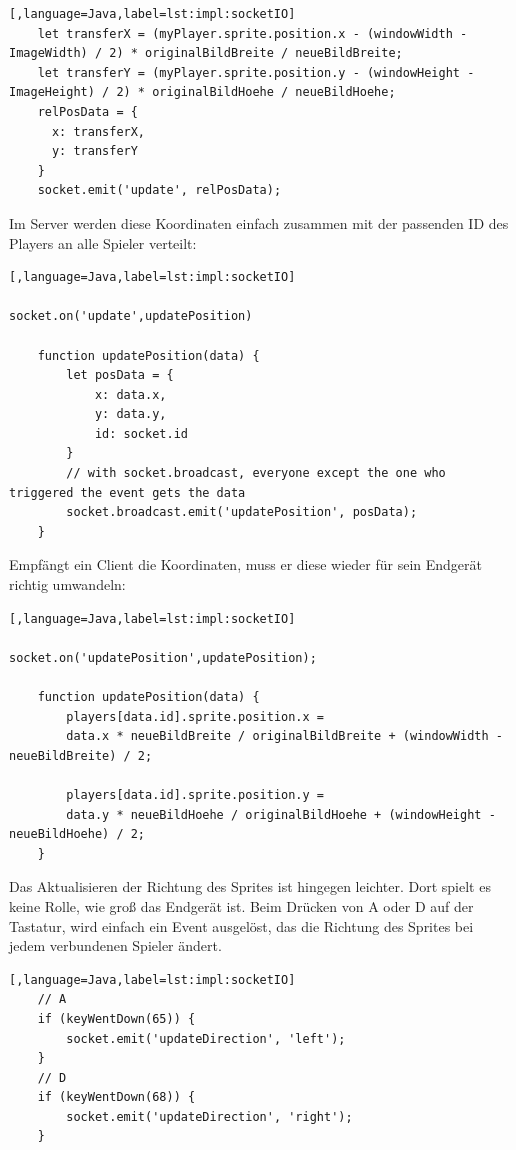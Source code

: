 \begin{lstlisting}[,language=Java,label=lst:impl:socketIO]
    let transferX = (myPlayer.sprite.position.x - (windowWidth - ImageWidth) / 2) * originalBildBreite / neueBildBreite;
    let transferY = (myPlayer.sprite.position.y - (windowHeight - ImageHeight) / 2) * originalBildHoehe / neueBildHoehe;
    relPosData = {
      x: transferX,
      y: transferY
    }
    socket.emit('update', relPosData);
\end{lstlisting}

Im Server werden diese Koordinaten einfach zusammen mit der passenden ID des Players an alle Spieler verteilt:

\begin{lstlisting}[,language=Java,label=lst:impl:socketIO]

socket.on('update',updatePosition)

    function updatePosition(data) {
        let posData = {
            x: data.x,
            y: data.y,
            id: socket.id
        }
        // with socket.broadcast, everyone except the one who triggered the event gets the data
        socket.broadcast.emit('updatePosition', posData);
    }
\end{lstlisting}

Empfängt ein Client die Koordinaten, muss er diese wieder für sein Endgerät richtig umwandeln:


\begin{lstlisting}[,language=Java,label=lst:impl:socketIO]

socket.on('updatePosition',updatePosition);

    function updatePosition(data) {
        players[data.id].sprite.position.x = 
        data.x * neueBildBreite / originalBildBreite + (windowWidth - neueBildBreite) / 2;

        players[data.id].sprite.position.y = 
        data.y * neueBildHoehe / originalBildHoehe + (windowHeight - neueBildHoehe) / 2;
    }
\end{lstlisting}

Das Aktualisieren der Richtung des Sprites ist hingegen leichter. Dort spielt es keine Rolle, wie groß das Endgerät ist.
Beim Drücken von A oder D auf der Tastatur, wird einfach ein Event ausgelöst, das die Richtung des Sprites bei jedem verbundenen Spieler ändert.


\begin{lstlisting}[,language=Java,label=lst:impl:socketIO]
    // A
    if (keyWentDown(65)) {
        socket.emit('updateDirection', 'left');
    }
    // D
    if (keyWentDown(68)) {
        socket.emit('updateDirection', 'right');
    }
\end{lstlisting}

